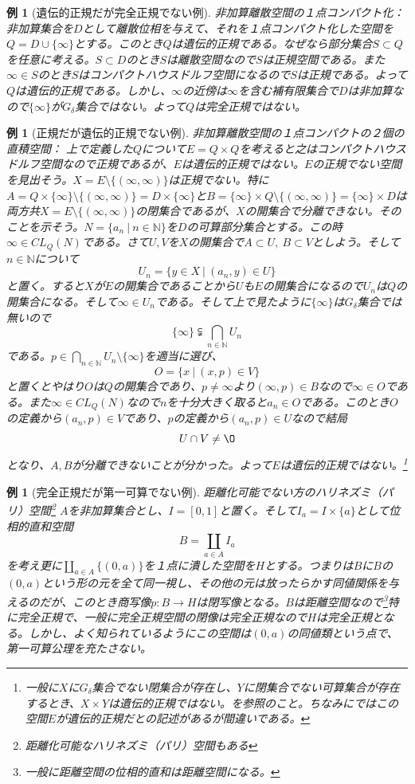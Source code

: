 \documentclass[leqno]{jsarticle}
\newtheorem{exam}[thm]{例}
\newcommand{\nn}{\mathbb{N}}
\newcommand{\mgn}{\infty}
\begin{document}
\begin{exam}[遺伝的正規だが完全正規でない例]非加算離散空間の１点コンパクト化：
非加算集合を$D$として離散位相を与えて、それを１点コンパクト化した空間を$Q=D\cup\{\mgn\}$とする。このとき$Q$は遺伝的正規である。なぜなら部分集合$S\subset Q$を任意に考える。$S\subset D$のとき$S$は離散空間なので$S$は正規空間である。また$\mgn\in S$のとき$S$はコンパクトハウスドルフ空間になるので$S$は正規である。よって$Q$は遺伝的正規である。しかし、$\mgn$の近傍は$\mgn$を含む補有限集合で$D$は非加算なので$\{\mgn\}$が$G_{\delta}$集合ではない。よって$Q$は完全正規ではない。
\end{exam}

\begin{exam}[正規だが遺伝的正規でない例]非加算離散空間の１点コンパクトの２個の直積空間：
上で定義した$Q$について$E=Q\times Q$を考えると之はコンパクトハウスドルフ空間なので正規であるが、$E$は遺伝的正規ではない。$E$の正規でない空間を見出そう。$X=E\setminus \{(\mgn,\mgn)\}$は正規でない。特に$A=Q\times \{\mgn\}\setminus  \{(\mgn,\mgn)\}=D\times \{\mgn\}$と$B=\{\mgn\}\times Q\setminus \{(\mgn,\mgn)\}=\{\mgn\}\times D$は両方共$X=E\setminus \{(\mgn,\mgn)\}$の閉集合であるが、$X$の開集合で分離できない。そのことを示そう。$N=\{a_n\ |\ n\in \nn\}$を$D$の可算部分集合とする。この時$\mgn\in CL_{Q}(N)$である。さて$U,V$を$X$の開集合で$A\subset U,\ B\subset V$としよう。そして$n\in \nn$について
\[
U_n=\{y\in X\ |\ (a_n,y)\in U\}
\]
と置く。すると$X$が$E$の開集合であることから$U$も$E$の開集合になるので$U_n$は$Q$の開集合になる。そして$\mgn \in U_n$である。そして上で見たように$\{\mgn\}$は$G_{\delta}$集合では無いので
\[
\{\mgn\}\subsetneqq \bigcap_{n\in \nn}U_n 
\]である。$p\in \bigcap_{n\in \nn}U_n\setminus \{\mgn\}$を適当に選び、
\[
O=\{x\ |\ (x,p)\in V\}
\]
と置くとやはり$O$は$Q$の開集合であり、$p\neq \mgn$より$(\mgn,p)\in B$なので$\mgn\in O$である。また$\mgn\in CL_{Q}(N)$なので$n$を十分大きく取ると$a_n\in O$である。このとき$O$の定義から$(a_n,p)\in V$であり、$p$の定義から$(a_n,p)\in U$なので結局
\[
U\cap V\neq\O
\]
となり、$A,B$が分離できないことが分かった。よって$E$は遺伝的正規ではない。\footnote{一般に$X$に$G_{\delta}$集合でない閉集合が存在し、$Y$に閉集合でない可算集合が存在するとき、$X\times Y$は遺伝的正規ではない。\cite{a}を参照のこと。ちなみに\cite{a}ではこの空間$E$が遺伝的正規だとの記述があるが間違いである。}
\end{exam}

\begin{exam}[完全正規だが第一可算でない例]距離化可能でない方のハリネズミ（パリ）空間\footnote{距離化可能なハリネズミ（パリ）空間もある}
$A$を非加算集合とし、$I=[0,1]$と置く。そして$I_a=I\times \{a\}$として位相的直和空間
\[
B=\coprod_{a\in A}I_a
\]
を考え更に$\coprod_{a\in A}\{(0,a)\}$を１点に潰した空間を$H$とする。つまりは$B$に$B$の$(0,a)$という形の元を全て同一視し、その他の元は放ったらかす同値関係を与えるのだが、このとき商写像$p:B\to H$は閉写像となる。$B$は距離空間なので\footnote{一般に距離空間の位相的直和は距離空間になる。}特に完全正規で、一般に完全正規空間の閉像は完全正規なので$H$は完全正規となる。しかし、よく知られているようにこの空間は$(0,a)$の同値類という点で、第一可算公理を充たさない。
\end{exam}
\end{document}

